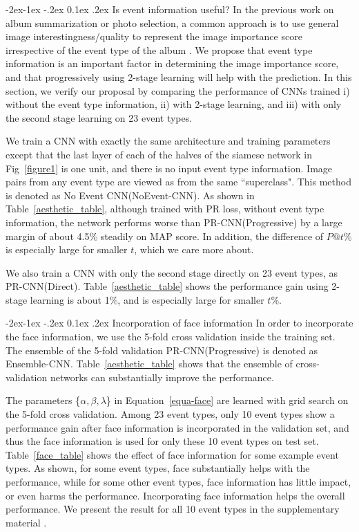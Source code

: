 \documentclass[10pt,twocolumn,letterpaper]{article}
\makeatletter
\renewcommand\subsubsection{\@startsection{subsubsection}{3}{\z@}%
                {-2ex\@plus -1ex \@minus -.2ex}%
                {0.1ex \@plus .2ex}%
                {\normalfont\normalsize\bfseries}}
\makeatother
\begin{document}
\subsubsection{Is event information useful?}
In the previous work on album summarization or photo selection, a common approach is to use general image interestingness/quality to represent the image importance score irrespective of the event type of the album \cite{photo_selection1, vacation, sum_pinaki} . We propose that event type information is an important factor in determining the image importance score,  and that progressively using 2-stage learning will help with the prediction. In this section, we verify our proposal by comparing the performance of CNNs trained i) without the event type information, ii) with 2-stage learning, and iii) with only the second stage learning on 23 event types. 

We train a CNN with exactly the same architecture and training parameters except that the last layer of each of the halves of the siamese network in Fig~\ref{figure1} is one unit, and there is no input event type information. Image pairs from any event type are viewed as from the same ``superclass". This method is denoted as No Event CNN(NoEvent-CNN).  As shown in Table~\ref{aesthetic_table}, although trained with PR loss, without event type information, the network performs worse than PR-CNN(Progressive) by a large margin of about 4.5\% steadily on MAP score. In addition, the difference of $P@t\%$ is especially large for smaller $t$, which we care more about.

We also train a CNN with only the second stage directly on 23 event types, as PR-CNN(Direct). Table~\ref{aesthetic_table} shows the performance gain using 2-stage learning is about 1\%, and is especially large for smaller $t\%$.
  
\subsubsection{Incorporation of face information}
In order to incorporate the face information, we use the 5-fold cross validation inside the training set. The ensemble of the 5-fold validation PR-CNN(Progressive) is denoted as Ensemble-CNN. Table~\ref{aesthetic_table} shows that the ensemble of cross-validation networks can substantially improve the performance. 

The parameters \{$\alpha, \beta, \lambda$\} in Equation~\ref{equa-face} are learned with grid search on the 5-fold cross validation. Among 23 event types, only 10 event types show a performance gain after face information is incorporated in the validation set, and thus the face information is used for only these 10 event types on test set. Table~\ref{face_table} shows the effect of face information for some example event types. As shown, for some event types, face substantially helps with the performance, while for some other event types, face information has little impact, or even harms the performance. Incorporating face information helps the overall performance. We present the result for all 10 event types in the supplementary material \cite{supplementary}. 
\end{document}
